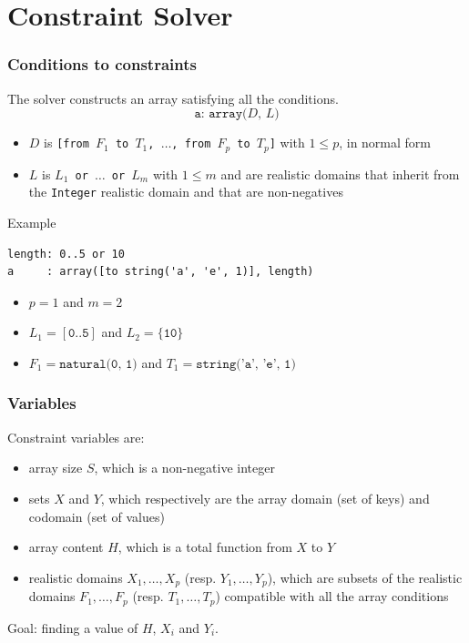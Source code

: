 \documentclass[9pt]{beamer}
\newcommand{\code}[1]{\texttt{#1}}
\newcommand{\outlinereminder}[0]{
  \frame{\frametitle{Outline}
  \tableofcontents[currentsection,subsectionstyle=show/show/hide]}
}
\begin{document}
\section[Solver]{Constraint Solver}

\outlinereminder

\begin{frame}[fragile]
\frametitle{Conditions to constraints}

The solver constructs an array satisfying all the conditions.
$$\code{a: array($D$, $L$)}$$
\vspace{-1.5em}
\begin{itemize}
\item $D$ is \code{[from $F_1$ to $T_1$, $\dots$, from $F_p$ to $T_p$]} with $1
\le p$, in normal form
\item $L$ is \code{$L_1$ or $\dots$ or $L_m$} with $1 \le m$ and are realistic
domains that inherit from the \code{Integer} realistic domain and that are
non-negatives
\end{itemize}

\begin{exampleblock}{Example}
\begin{verbatim}
length: 0..5 or 10
a     : array([to string('a', 'e', 1)], length)
\end{verbatim}
\begin{itemize}
\item $p = 1$ and $m = 2$
\item $L_1 = [\code{0..5}]$ and $L_2 = \{\code{10}\}$
\item $F_1 = \code{natural(0, 1)}$ and $T_1 = \code{string('a', 'e', 1)}$
\end{itemize}
\end{exampleblock}

\end{frame}

\begin{frame}
\frametitle{Variables}

Constraint variables are:
\begin{itemize}
\item array size $S$, which is a non-negative integer
\item sets $X$ and $Y$, which respectively are the array domain (set of
keys) and codomain (set of values)
\item array content $H$, which is a total function from $X$ to $Y$
\item realistic domains $X_1, \dots, X_p$ (resp. $Y_1, \dots, Y_p$), which
are subsets of the realistic domains $F_1, \dots, F_p$ (resp. $T_1, \dots, T_p$)
compatible with all the array conditions
\end{itemize}
Goal: finding a value of $H$, $X_i$ and $Y_i$.

\end{frame}
\end{document}
